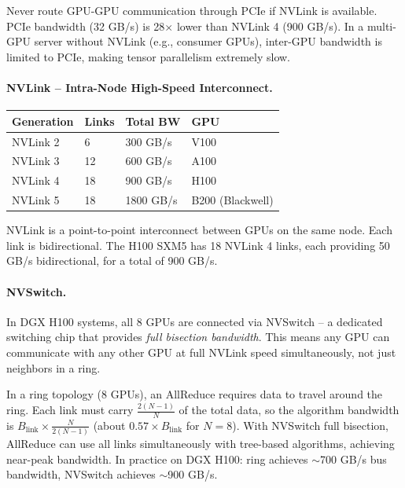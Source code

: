 \begin{warningbox}
Never route GPU-GPU communication through PCIe if NVLink is available. PCIe bandwidth (32 GB/s) is 28$\times$ lower than NVLink 4 (900 GB/s). In a multi-GPU server without NVLink (e.g., consumer GPUs), inter-GPU bandwidth is limited to PCIe, making tensor parallelism extremely slow.
\end{warningbox}

\newpage
\paragraph{NVLink -- Intra-Node High-Speed Interconnect.}
\label{nvlink-intra-node-high-speed-interconnect.}
\nopagebreak
\begin{keybox}
\begin{tabular}{@{}lp{3.5cm}p{3.5cm}p{6cm}@{}}
\toprule
\textbf{Generation} & \textbf{Links} & \textbf{Total BW} & \textbf{GPU} \\
\midrule
NVLink 2 & 6 & 300 GB/s & V100 \\
NVLink 3 & 12 & 600 GB/s & A100 \\
NVLink 4 & 18 & 900 GB/s & H100 \\
NVLink 5 & 18 & 1800 GB/s & B200 (Blackwell) \\
\bottomrule
\end{tabular}
\end{keybox}

NVLink is a point-to-point interconnect between GPUs on the same node. Each link is bidirectional. The H100 SXM5 has 18 NVLink 4 links, each providing 50 GB/s bidirectional, for a total of 900 GB/s.

\paragraph{NVSwitch.}
\label{nvswitch.}

In DGX H100 systems, all 8 GPUs are connected via NVSwitch -- a dedicated switching chip that provides \emph{full bisection bandwidth}. This means any GPU can communicate with any other GPU at full NVLink speed simultaneously, not just neighbors in a ring.

\begin{intuitionbox}
In a ring topology (8 GPUs), an AllReduce requires data to travel around the ring. Each link must carry $\frac{2(N-1)}{N}$ of the total data, so the algorithm bandwidth is $B_{\text{link}} \times \frac{N}{2(N-1)}$ (about $0.57 \times B_{\text{link}}$ for $N=8$). With NVSwitch full bisection, AllReduce can use all links simultaneously with tree-based algorithms, achieving near-peak bandwidth. In practice on DGX H100: ring achieves $\sim$700 GB/s bus bandwidth, NVSwitch achieves $\sim$900 GB/s.
\end{intuitionbox}

